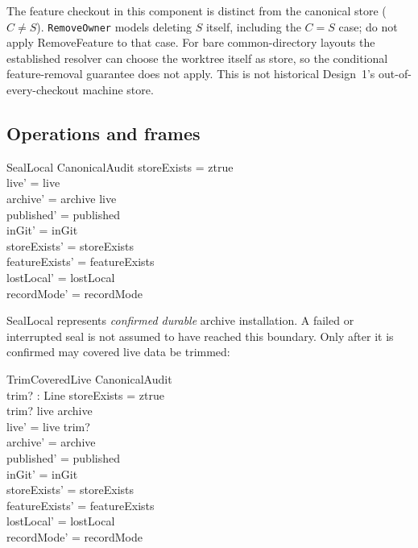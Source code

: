 \documentclass[a4paper,10pt,fleqn]{article}
\newcommand{\field}[1]{\ifmmode\texttt{#1}\else\texorpdfstring{\breakfield{#1}}{#1}\fi}
\begin{document}
The feature checkout in this component is distinct from the canonical
store ($C \neq S$). \field{RemoveOwner} models deleting $S$ itself,
including the $C=S$ case; do not apply RemoveFeature to that case.
For bare common-directory layouts the established resolver can choose
the worktree itself as store, so the conditional feature-removal
guarantee does not apply. This is not historical Design~1's
out-of-every-checkout machine store.

\subsection{Operations and frames}

\begin{schema}{SealLocal}
\Delta CanonicalAudit
\where
storeExists = ztrue \\
live' = live \\
archive' = archive \cup live \\
published' = published \\
inGit' = inGit \\
storeExists' = storeExists \\
featureExists' = featureExists \\
lostLocal' = lostLocal \\
recordMode' = recordMode
\end{schema}

SealLocal represents \emph{confirmed durable} archive installation.
A failed or interrupted seal is not assumed to have reached this
boundary. Only after it is confirmed may covered live data be trimmed:

\begin{schema}{TrimCoveredLive}
\Delta CanonicalAudit \\
trim? : \power Line
\where
storeExists = ztrue \\
trim? \subseteq live \cap archive \\
live' = live \setminus trim? \\
archive' = archive \\
published' = published \\
inGit' = inGit \\
storeExists' = storeExists \\
featureExists' = featureExists \\
lostLocal' = lostLocal \\
recordMode' = recordMode
\end{schema}
\end{document}
